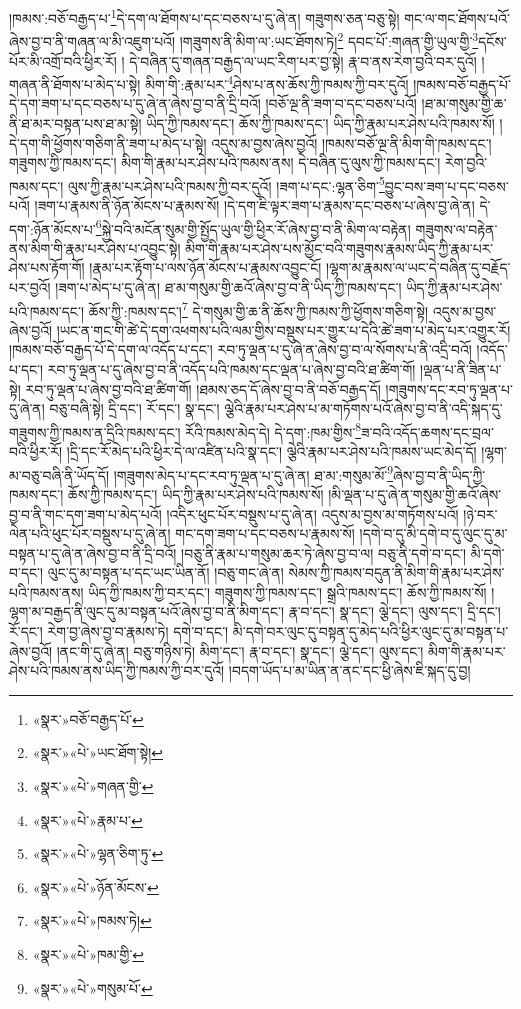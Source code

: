 །ཁམས་:བཅོ་བརྒྱད་པ་\footnote{«སྣར་»བཅོ་བརྒྱད་པོ་}དེ་དག་ལ་ཐོགས་པ་དང་བཅས་པ་དུ་ཞེ་ན། གཟུགས་ཅན་བཅུ་སྟེ། གང་ལ་གང་ཐོགས་པའོ་ཞེས་བྱ་བ་ནི་གཞན་ལ་མི་འཇུག་པའོ། །གཟུགས་ནི་མིག་ལ་:ཡང་ཐོགས་ཏེ།\footnote{«སྣར་»«པེ་»ཡང་ཐོག་སྟེ།} དབང་པོ་:གཞན་གྱི་ཡུལ་གྱི་\footnote{«སྣར་»«པེ་»གཞན་གྱི་}དངོས་པོར་མི་འགྲོ་བའི་ཕྱིར་རོ། །
དེ་བཞིན་དུ་གཞན་བརྒྱད་ལ་ཡང་རིག་པར་བྱ་སྟེ། རྣ་བ་ནས་རེག་བྱའི་བར་དུའོ། །གཞན་ནི་ཐོགས་པ་མེད་པ་སྟེ། མིག་གི་:རྣམ་པར་\footnote{«སྣར་»«པེ་»རྣམ་པ་}ཤེས་པ་ནས་ཆོས་ཀྱི་ཁམས་ཀྱི་བར་དུའོ། །ཁམས་བཅོ་བརྒྱད་པོ་དེ་དག་ཟག་པ་དང་བཅས་པ་དུ་ཞེ་ན་ཞེས་བྱ་བ་ནི་དྲི་བའོ། །བཅོ་ལྔ་ནི་ཟག་བ་དང་བཅས་པའོ། །ཐ་མ་གསུམ་གྱི་ཆ་ནི་ཐ་མར་བསྟན་པས་ཐ་མ་སྟེ། ཡིད་ཀྱི་ཁམས་དང་། ཆོས་ཀྱི་ཁམས་དང་། ཡིད་ཀྱི་རྣམ་པར་ཤེས་པའི་ཁམས་སོ། །དེ་དག་གི་ཕྱོགས་གཅིག་ནི་ཟག་པ་མེད་པ་སྟེ། འདུས་མ་བྱས་ཞེས་བྱའོ། །ཁམས་བཅོ་ལྔ་ནི་མིག་གི་ཁམས་དང་། གཟུགས་ཀྱི་ཁམས་དང་། མིག་གི་རྣམ་པར་ཤེས་པའི་ཁམས་ནས། དེ་བཞིན་དུ་ལུས་ཀྱི་ཁམས་དང་། རེག་བྱའི་ཁམས་དང་། ལུས་ཀྱི་རྣམ་པར་ཤེས་པའི་ཁམས་ཀྱི་བར་དུའོ། །ཟག་པ་དང་:ལྷན་ཅིག་\footnote{«སྣར་»«པེ་»ལྷན་ཅིག་ཏུ་}བྱུང་བས་ཟག་པ་དང་བཅས་པའོ། །ཟག་པ་རྣམས་ནི་ཉོན་མོངས་པ་རྣམས་སོ། །དེ་དག་ཇི་ལྟར་ཟག་པ་རྣམས་དང་བཅས་པ་ཞེས་བྱ་ཞེ་ན། དེ་དག་:ཉོན་མོངས་པ་\footnote{«སྣར་»«པེ་»ཉོན་མོངས་}སྐྱེ་བའི་མངོན་སུམ་གྱི་སྤྱོད་ཡུལ་གྱི་ཕྱིར་རོ་ཞེས་བྱ་བ་ནི་མིག་ལ་བརྟེན། གཟུགས་ལ་བརྟེན་ནས་མིག་གི་རྣམ་པར་ཤེས་པ་འབྱུང་སྟེ། མིག་གི་རྣམ་པར་ཤེས་པས་མྱོང་བའི་གཟུགས་རྣམས་ཡིད་ཀྱི་རྣམ་པར་ཤེས་པས་རྟོག་གོ། །རྣམ་པར་རྟོག་པ་ལས་ཉོན་མོངས་པ་རྣམས་འབྱུང་ངོ། །ལྷག་མ་རྣམས་ལ་ཡང་དེ་བཞིན་དུ་བརྗོད་པར་བྱའོ། །ཟག་པ་མེད་པ་དུ་ཞེ་ན། ཐ་མ་གསུམ་གྱི་ཆའོ་ཞེས་བྱ་བ་ནི་ཡིད་ཀྱི་ཁམས་དང་། ཡིད་ཀྱི་རྣམ་པར་ཤེས་པའི་ཁམས་དང་། ཆོས་ཀྱི་:ཁམས་དང་།\footnote{«སྣར་»«པེ་»ཁམས་ཏེ།} དེ་གསུམ་གྱི་ཆ་ནི་ཆོས་ཀྱི་ཁམས་ཀྱི་ཕྱོགས་གཅིག་སྟེ། འདུས་མ་བྱས་ཞེས་བྱའོ། །ཡང་ན་གང་གི་ཚེ་དེ་དག་འཕགས་པའི་ལམ་གྱིས་བསྡུས་པར་གྱུར་པ་དེའི་ཚེ་ཟག་པ་མེད་པར་འགྱུར་རོ། །ཁམས་བཅོ་བརྒྱད་པོ་དེ་དག་ལ་འདོད་པ་དང་། རབ་ཏུ་ལྡན་པ་དུ་ཞེ་ན་ཞེས་བྱ་བ་ལ་སོགས་པ་ནི་འདྲི་བའོ། །འདོད་པ་དང་། རབ་ཏུ་ལྡན་པ་དུ་ཞེས་བྱ་བ་ནི་འདོད་པའི་ཁམས་དང་ལྡན་པ་ཞེས་བྱ་བའི་ཐ་ཚིག་གོ། །ལྡན་པ་ནི་ཟིན་པ་སྟེ། རབ་ཏུ་ལྡན་པ་ཞེས་བྱ་བའི་ཐ་ཚིག་གོ། །ཐམས་ཅད་དོ་ཞེས་བྱ་བ་ནི་བཅོ་བརྒྱད་དོ། །གཟུགས་དང་རབ་ཏུ་ལྡན་པ་དུ་ཞེ་ན། བཅུ་བཞི་སྟེ། དྲི་དང་། རོ་དང་། སྣ་དང་། ལྕེའི་རྣམ་པར་ཤེས་པ་མ་གཏོགས་པའོ་ཞེས་བྱ་བ་ནི་འདི་སྐད་དུ་གཟུགས་ཀྱི་ཁམས་ན་དྲིའི་ཁམས་དང་། རོའི་ཁམས་མེད་དེ། དེ་དག་:ཁམ་གྱིས་\footnote{«སྣར་»«པེ་»ཁམ་གྱི་}ཟ་བའི་འདོད་ཆགས་དང་བྲལ་བའི་ཕྱིར་རོ། །དྲི་དང་རོ་མེད་པའི་ཕྱིར་དེ་ལ་འཛིན་པའི་སྣ་དང་། ལྕེའི་རྣམ་པར་ཤེས་པའི་ཁམས་ཡང་མེད་དོ། །ལྷག་མ་བཅུ་བཞི་ནི་ཡོད་དོ། །གཟུགས་མེད་པ་དང་རབ་ཏུ་ལྡན་པ་དུ་ཞེ་ན། ཐ་མ་:གསུམ་མོ་\footnote{«སྣར་»«པེ་»གསུམ་པོ་}ཞེས་བྱ་བ་ནི་ཡིད་ཀྱི་ཁམས་དང་། ཆོས་ཀྱི་ཁམས་དང་། ཡིད་ཀྱི་རྣམ་པར་ཤེས་པའི་ཁམས་སོ། །མི་ལྡན་པ་དུ་ཞེ་ན་གསུམ་གྱི་ཆའོ་ཞེས་བྱ་བ་ནི་གང་དག་ཟག་པ་མེད་པའོ། །འདིར་ཕུང་པོར་བསྡུས་པ་དུ་ཞེ་ན། འདུས་མ་བྱས་མ་གཏོགས་པའོ། །ཉེ་བར་ལེན་པའི་ཕུང་པོར་བསྡུས་པ་དུ་ཞེ་ན། གང་དག་ཟག་པ་དང་བཅས་པ་རྣམས་སོ། །དགེ་བ་དུ་མི་དགེ་བ་དུ་ལུང་དུ་མ་བསྟན་པ་དུ་ཞེ་ན་ཞེས་བྱ་བ་ནི་དྲི་བའོ། །བཅུ་ནི་རྣམ་པ་གསུམ་ཆར་ཏེ་ཞེས་བྱ་བ་ལ། བཅུ་ནི་དགེ་བ་དང་། མི་དགེ་བ་དང་། ལུང་དུ་མ་བསྟན་པ་དང་ཡང་ཡིན་ནོ། །བཅུ་གང་ཞེ་ན། སེམས་ཀྱི་ཁམས་བདུན་ནི་མིག་གི་རྣམ་པར་ཤེས་པའི་ཁམས་ནས། ཡིད་ཀྱི་ཁམས་ཀྱི་བར་དང་། གཟུགས་ཀྱི་ཁམས་དང་། སྒྲའི་ཁམས་དང་། ཆོས་ཀྱི་ཁམས་སོ། །ལྷག་མ་བརྒྱད་ནི་ལུང་དུ་མ་བསྟན་པའོ་ཞེས་བྱ་བ་ནི་མིག་དང་། རྣ་བ་དང་། སྣ་དང་། ལྕེ་དང་། ལུས་དང་། དྲི་དང་། རོ་དང་། རེག་བྱ་ཞེས་བྱ་བ་རྣམས་ཏེ། དགེ་བ་དང་། མི་དགེ་བར་ལུང་དུ་བསྟན་དུ་མེད་པའི་ཕྱིར་ལུང་དུ་མ་བསྟན་པ་ཞེས་བྱའོ། །ནང་གི་དུ་ཞེ་ན། བཅུ་གཉིས་ཏེ། མིག་དང་། རྣ་བ་དང་། སྣ་དང་། ལྕེ་དང་། ལུས་དང་། མིག་གི་རྣམ་པར་ཤེས་པའི་ཁམས་ནས་ཡིད་ཀྱི་ཁམས་ཀྱི་བར་དུའོ། །བདག་ཡོད་པ་མ་ཡིན་ན་ནང་དང་ཕྱི་ཞེས་ཇི་སྐད་དུ་བྱ། 